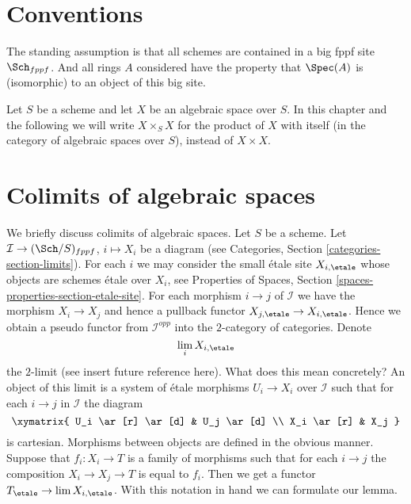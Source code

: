 \section{Conventions}
\label{section-conventions}

\noindent
The standing assumption is that all schemes are contained in
a big fppf site $\Sch_{fppf}$. And all rings $A$ considered
have the property that $\Spec(A)$ is (isomorphic) to an
object of this big site.

\medskip\noindent
Let $S$ be a scheme and let $X$ be an algebraic space over $S$.
In this chapter and the following we will write $X \times_S X$
for the product of $X$ with itself (in the category of algebraic
spaces over $S$), instead of $X \times X$.




\section{Colimits of algebraic spaces}
\label{section-pushouts-generalities}

\noindent
We briefly discuss colimits of algebraic spaces. Let $S$ be a scheme.
Let $\mathcal{I} \to (\Sch/S)_{fppf}$, $i \mapsto X_i$
be a diagram (see Categories, Section \ref{categories-section-limits}).
For each $i$ we may consider the small \'etale site $X_{i, \etale}$
whose objects are schemes \'etale over $X_i$, see
Properties of Spaces, Section \ref{spaces-properties-section-etale-site}.
For each morphism $i \to j$ of $\mathcal{I}$ we have the morphism
$X_i \to X_j$ and hence a pullback functor
$X_{j, \etale} \to X_{i, \etale}$.
Hence we obtain a pseudo functor from $\mathcal{I}^{opp}$ into
the $2$-category of categories. Denote
$$
\lim_i X_{i, \etale}
$$
the $2$-limit (see insert future reference here). What does this mean
concretely? An object of this limit is a system of \'etale morphisms
$U_i \to X_i$ over $\mathcal{I}$ such that for each $i \to j$ in
$\mathcal{I}$ the diagram
$$
\xymatrix{
U_i \ar[r] \ar[d] & U_j \ar[d] \\
X_i \ar[r] & X_j
}
$$
is cartesian. Morphisms between objects are defined in the obvious manner.
Suppose that $f_i : X_i \to T$ is a family of morphisms such that
for each $i \to j$ the composition $X_i \to X_j \to T$ is equal to $f_i$.
Then we get a functor $T_\etale \to \lim X_{i, \etale}$.
With this notation in hand we can formulate our lemma.

